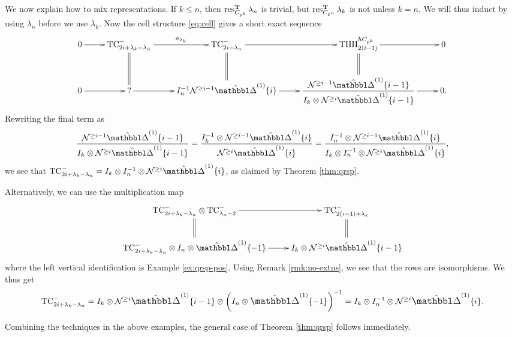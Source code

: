 \begin{example}
  We now explain how to mix representations. If $k\le n$, then $\operatorname{res}^\mathbf T_{C_{p^k}} \lambda_n$ is trivial, but $\operatorname{res}^\mathbf T_{C_{p^n}} \lambda_k$ is not unless $k=n$. We will thus induct by using $\lambda_n$ before we use $\lambda_k$. Now the cell structure \eqref{eq:cell} gives a short exact sequence
  \[\xymatrix{
      0 \ar[r] & \TCmin_{2i+\lambda_k-\lambda_n} \ar[r]^-{a_{\lambda_k}} \ar@{=}[d] & \TCmin_{2i-\lambda_n} \ar[r] \ar@{=}[d] & \THH^{hC_{p^k}}_{2(i-1)} \ar[r] \ar@{=}[d] & 0\\
      0 \ar[r] & ? \ar[r] & I_n^{-1}\Nyg^{\ge i-1}\vprism\{i\} \ar[r] & \dfrac{\Nyg^{\ge i-1}\vprism\{i-1\}}{I_k\tnsr\Nyg^{\ge i}\vprism\{i-1\}} \ar[r] & 0.
  }\]
  Rewriting the final term as
  \[
    \dfrac{\Nyg^{\ge i-1}\vprism\{i-1\}}{I_k\tnsr\Nyg^{\ge i}\vprism\{i-1\}}
    =
    \dfrac{I_k^{-1}\tnsr\Nyg^{\ge i-1}\vprism\{i\}}{\Nyg^{\ge i}\vprism\{i\}}
    =
    \dfrac{I_n^{-1}\tnsr\Nyg^{\ge i-1}\vprism\{i\}}{I_k\tnsr I_n^{-1}\tnsr\Nyg^{\ge i}\vprism\{i\}},
  \]
  we see that $\TCmin_{2i+\lambda_k-\lambda_n}=I_k\tnsr I_n^{-1}\tnsr\Nyg^{\ge i}\vprism\{i\}$, as claimed by Theorem \ref{thm:qrsp}.

  Alternatively, we can use the multiplication map
  \[\xymatrix{
      \TCmin_{2i+\lambda_k-\lambda_n} \tnsr \TCmin_{\lambda_n-2} \ar[r] \ar@{=}[d] & \TCmin_{2(i-1)+\lambda_k} \ar@{=}[d]\\
      \TCmin_{2i+\lambda_k-\lambda_n} \tnsr I_n\tnsr\vprism\{-1\} \ar[r] & I_k\tnsr\Nyg^{\ge i}\vprism\{i-1\}
  }\]
  where the left vertical identification is Example \ref{ex:qrsp-pos}. Using Remark \ref{rmk:no-extns}, we see that the rows are isomorphisms. We thus get
  \[ \TCmin_{2i+\lambda_k-\lambda_n} = I_k\tnsr\Nyg^{\ge i}\vprism\{i-1\}\tnsr\left(I_n\tnsr\vprism\{-1\}\right)^{-1} = I_k\tnsr I_n^{-1}\tnsr\Nyg^{\ge i}\vprism\{i\}. \]
\end{example}

Combining the techniques in the above examples, the general case of Theorem \ref{thm:qrsp} follows immediately.


